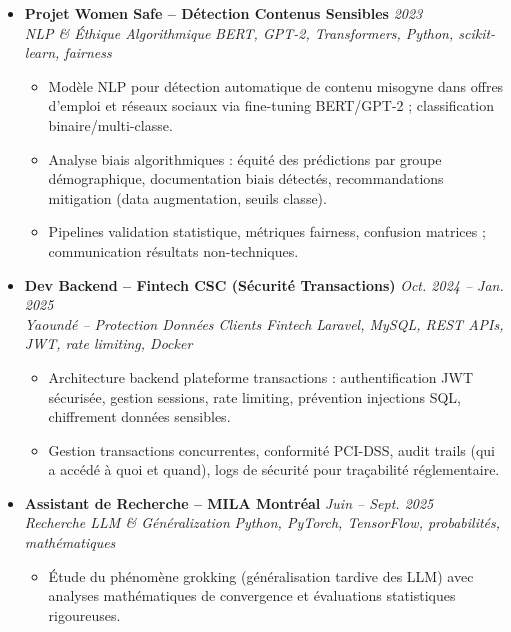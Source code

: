 \documentclass[a4paper,11pt]{article}
\begin{document}
\begin{itemize}[leftmargin=*, label={-}]
    \item \textbf{Projet Women Safe -- D\'etection Contenus Sensibles} \hfill \textit{2023} \\
    \textit{NLP \& \'Ethique Algorithmique} \hfill \textit{BERT, GPT-2, Transformers, Python, scikit-learn, fairness}
    \vspace{-2pt}
    \begin{itemize}[leftmargin=0.4cm, nosep, label=\tiny$\bullet$]
        \item \small{Modèle NLP pour détection automatique de contenu misogyne dans offres d'emploi et réseaux sociaux via fine-tuning BERT/GPT-2 ; classification binaire/multi-classe.}
        \item \small{Analyse biais algorithmiques : équité des prédictions par groupe démographique, documentation biais détectés, recommandations mitigation (data augmentation, seuils classe).}
        \item \small{Pipelines validation statistique, métriques fairness, confusion matrices ; communication résultats non-techniques.}
    \end{itemize}
    \vspace{3pt}

    \item \textbf{Dev Backend -- Fintech CSC (Sécurité Transactions)} \hfill \textit{Oct. 2024 -- Jan. 2025} \\
    \textit{Yaoundé -- Protection Données Clients Fintech} \hfill \textit{Laravel, MySQL, REST APIs, JWT, rate limiting, Docker}
    \vspace{-2pt}
    \begin{itemize}[leftmargin=0.4cm, nosep, label=\tiny$\bullet$]
        \item \small{Architecture backend plateforme transactions : authentification JWT sécurisée, gestion sessions, rate limiting, prévention injections SQL, chiffrement données sensibles.}
        \item \small{Gestion transactions concurrentes, conformité PCI-DSS, audit trails (qui a accédé à quoi et quand), logs de sécurité pour traçabilité réglementaire.}
    \end{itemize}
    \vspace{3pt}

    \item \textbf{Assistant de Recherche -- MILA Montréal} \hfill \textit{Juin -- Sept. 2025} \\
    \textit{Recherche LLM \& Généralization} \hfill \textit{Python, PyTorch, TensorFlow, probabilités, mathématiques}
    \vspace{-2pt}
    \begin{itemize}[leftmargin=0.4cm, nosep, label=\tiny$\bullet$]
        \item \small{Étude du phénomène grokking (généralisation tardive des LLM) avec analyses mathématiques de convergence et évaluations statistiques rigoureuses.}
    \end{itemize}
    \vspace{3pt}


\end{itemize}
\end{document}
